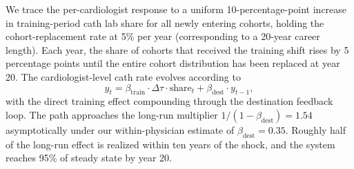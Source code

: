 \documentclass[12pt]{article}
\begin{document}
We trace the per-cardiologist response to a uniform 10-percentage-point increase in training-period cath lab share for all newly entering cohorts, holding the cohort-replacement rate at 5\% per year (corresponding to a 20-year career length). Each year, the share of cohorts that received the training shift rises by 5 percentage points until the entire cohort distribution has been replaced at year 20. The cardiologist-level cath rate evolves according to
\begin{equation*}
y_t = \beta_{\text{train}} \cdot \Delta\tau \cdot \text{share}_t + \beta_{\text{dest}} \cdot y_{t-1},
\end{equation*}
with the direct training effect compounding through the destination feedback loop. The path approaches the long-run multiplier $1/(1 - \beta_{\text{dest}}) = 1.54$ asymptotically under our within-physician estimate of $\beta_{\text{dest}} = 0.35$. Roughly half of the long-run effect is realized within ten years of the shock, and the system reaches 95\% of steady state by year 20.

\clearpage

\begin{singlespace}


\end{singlespace}
\end{document}
